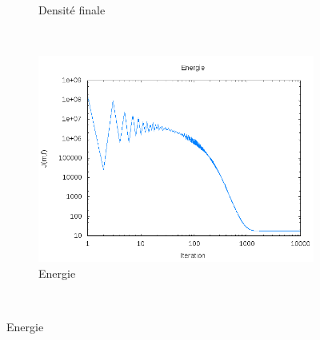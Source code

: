 \documentclass[a4paper,12pt]{article}
\begin{document}
\begin{figure}[!h]
\begin{subfigure}[b]{0.3\linewidth}
	\caption{Densité finale}
	\end{subfigure}
	~
	\begin{subfigure}[b]{0.35\linewidth}
	\includegraphics[width=\textwidth]{img/2DGaussian/energie.png}
	\caption{Energie}
	\end{subfigure}
	~
	

\end{figure}
\end{document}
